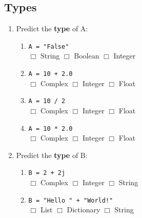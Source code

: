 \documentclass[11pt]{report}
\begin{document}
\subsection*{Types}
\begin{enumerate}

    \item Predict the \textbf{type} of A:

    \begin{enumerate}
        \item {\tt A = "False"}\\
        $\Box$ String \hspace{3em} $\Box$ Boolean \hspace{3em} $\Box$ Integer\\

        \item {\tt A = 10 + 2.0}\\
        $\Box$ Complex \hspace{3em} $\Box$ Integer \hspace{3em} $\Box$ Float\\

        \item  {\tt A = 10 / 2}\\
        $\Box$ Complex \hspace{3em} $\Box$ Integer \hspace{3em} $\Box$ Float\\

        \item {\tt A = 10 * 2.0}\\
        $\Box$ Complex \hspace{3em} $\Box$ Integer \hspace{3em} $\Box$ Float\\
    \end{enumerate}

    \item Predict the \textbf{type} of B:

    \begin{enumerate}
        \item {\tt B = 2 + 2j}\\
        $\Box$ Complex \hspace{3em} $\Box$ Integer \hspace{3em} $\Box$ String \hspace{3em} \\

        \item {\tt B = "Hello " + "World!"}\\
        $\Box$ List \hspace{3em} $\Box$ Dictionary \hspace{3em} $\Box$ String \\


\end{enumerate}
\end{enumerate}
\end{document}
